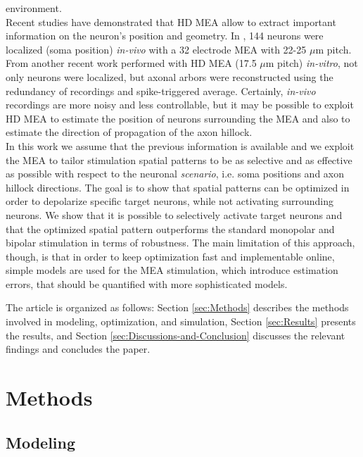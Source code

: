 \documentclass[conference]{IEEEtran}
\begin{document}
environment. \\
Recent studies have demonstrated that HD MEA allow to extract important
information on the neuron's position and geometry. In \cite{ruz2014localising},
144 neurons were localized (soma position)\emph{ in-vivo} with a 32
electrode MEA with 22-25 $\mu$m pitch. From another recent
work \cite{muller2015high} performed with HD MEA (17.5 $\mu$m
pitch)\emph{ in-vitro}, not only neurons were localized, but axonal
arbors were reconstructed using the redundancy of recordings and spike-triggered
average. Certainly, \emph{in-vivo} recordings are more noisy and less
controllable, but it may be possible to exploit HD MEA to estimate
the position of neurons surrounding the MEA and also to estimate the
direction of propagation of the axon hillock. \\
In this work we assume that the previous information is available
and we exploit the MEA to tailor stimulation spatial patterns to be
as selective and as effective as possible with respect to the neuronal
\emph{scenario}, i.e. soma positions and axon hillock directions. 
The goal is to show that spatial patterns can be
optimized in order to depolarize specific target neurons, while not
activating surrounding neurons. We show that it is possible to selectively
activate target neurons and that the optimized spatial pattern outperforms
the standard monopolar and bipolar stimulation in terms of robustness.
The main limitation of this approach, though, is that in order to
keep optimization fast and implementable online, simple models are
used for the MEA stimulation, which introduce estimation errors, that
should be quantified with more sophisticated models. \par
The article is organized as follows: Section \ref{sec:Methods} describes
the methods involved in modeling, optimization, and simulation, Section
\ref{sec:Results} presents the results, and Section \ref{sec:Discussions-and-Conclusion}
discusses the relevant findings and concludes the paper.

\section{Methods\label{sec:Methods}}


\subsection{Modeling\label{sub:Modeling}}
\end{document}
